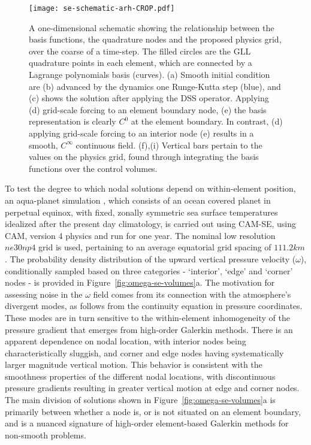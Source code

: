 \documentclass{ametsoc}
\begin{document}
\begin{figure}[t]
\noindent\texttt{[image: se-schematic-arh-CROP.pdf]}\\
\caption{A one-dimensional schematic showing the relationship between the basis functions, the quadrature nodes and the proposed physics grid, over the coarse of a time-step. The filled circles are the GLL quadrature points in each element, which are connected by a Lagrange polynomials basis (curves). (a) Smooth initial condition are (b) advanced by the dynamics one Runge-Kutta step (blue), and (c) shows the solution after applying the DSS operator. Applying (d) grid-scale forcing to an element boundary node, (e) the basis representation is clearly $C^0$ at the element boundary. In contrast, (d) applying grid-scale forcing to an interior node (e) results in a smooth, $C^{\infty}$ continuous field. (f),(i) Vertical bars pertain to the values on the physics grid, found through integrating the basis functions over the control volumes.}
\label{fig:se-schematic}
\end{figure}

To test the degree to which nodal solutions depend on within-element position, an aqua-planet simulation \citep{NH2000ASL,MWO2016JAMES}, which consists of an ocean covered planet in perpetual equinox, with fixed, zonally symmetric sea surface temperatures idealized after the present day climatology, is carried out using CAM-SE, using CAM, version 4 physics \citep[CAM4;][]{CAM4} and run for one year. The nominal low resolution $ne30np4$ grid is used, pertaining to an average equatorial grid spacing of $111.2km$. The probability density distribution of the upward vertical pressure velocity ($\omega$), conditionally sampled based on three categories - `interior', `edge' and `corner' nodes - is provided in Figure~\ref{fig:omega-se-volumes}a. The motivation for assessing noise in the $\omega$ field comes from its connection with the atmosphere's divergent modes, as follows from the continuity equation in pressure coordinates. These modes are in turn sensitive to the within-element inhomogeneity of the pressure gradient that emerges from high-order Galerkin methods. There is an apparent dependence on nodal location, with interior nodes being characteristically sluggish, and corner and edge nodes having systematically larger magnitude vertical motion. This behavior is consistent with the smoothness properties of the different nodal locations, with discontinuous pressure gradients resulting in greater vertical motion at edge and corner nodes. The main division of solutions shown in Figure~\ref{fig:omega-se-volumes}a is primarily between whether a node is, or is not situated on an element boundary, and is a nuanced signature of high-order element-based Galerkin methods for non-smooth problems.
\end{document}
